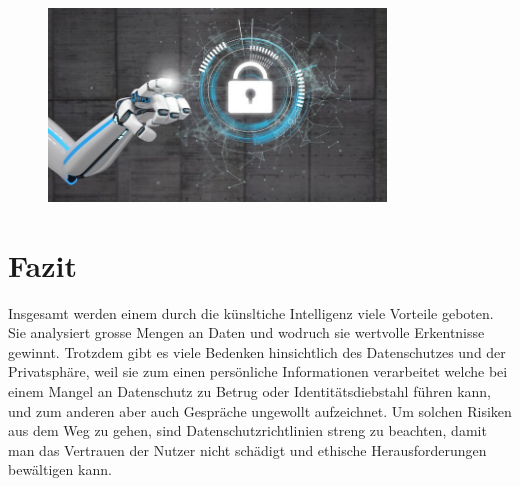 \documentclass{report}
\begin{document}
\begin{figure}[h]
    \centering
    \includegraphics[width=0.8\textwidth]{datenschutz.jpg}
    \end{figure}


    \chapter{Fazit}

    Insgesamt werden einem durch die künsltiche Intelligenz viele Vorteile geboten. Sie analysiert grosse Mengen an Daten und wodruch sie wertvolle Erkentnisse gewinnt. Trotzdem gibt es viele Bedenken hinsichtlich des Datenschutzes und der Privatsphäre, weil sie zum einen persönliche Informationen verarbeitet welche bei einem Mangel an Datenschutz zu Betrug oder Identitätsdiebstahl führen kann, und zum anderen aber auch Gespräche ungewollt aufzeichnet. Um solchen Risiken aus dem Weg zu gehen, sind Datenschutzrichtlinien streng zu beachten, damit man das Vertrauen der Nutzer nicht schädigt und ethische Herausforderungen bewältigen kann.




\nocite{*}

\printbibliography
\end{document}
